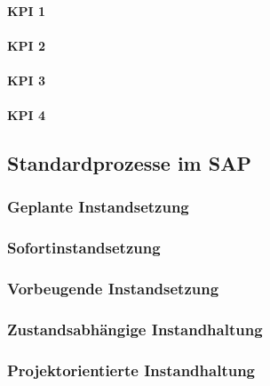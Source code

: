 \paragraph{KPI 1}

\paragraph{KPI 2}

\paragraph{KPI 3}

\paragraph{KPI 4}

\subsection{Standardprozesse im SAP}

\subsubsection{Geplante Instandsetzung}

\subsubsection{Sofortinstandsetzung}

\subsubsection{Vorbeugende Instandsetzung}

\subsubsection{Zustandsabhängige Instandhaltung}

\subsubsection{Projektorientierte Instandhaltung}

\newpage